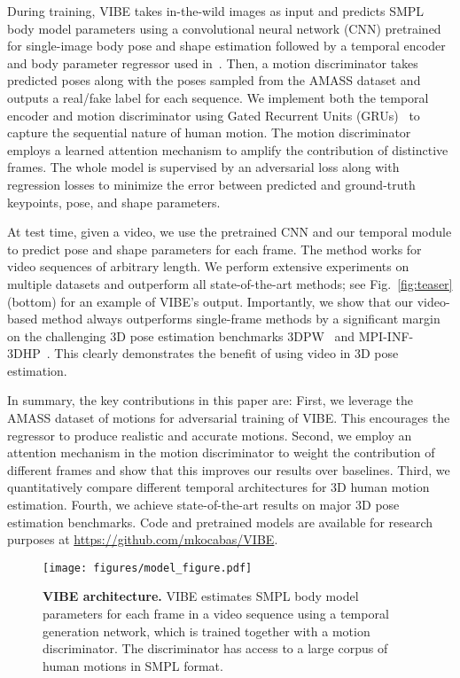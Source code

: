 \documentclass[10pt,twocolumn,letterpaper]{article}
\begin{document}
During training, VIBE takes in-the-wild images as input and predicts SMPL body model parameters using a convolutional neural network (CNN) pretrained for single-image body pose and shape estimation \cite{SPIN:ICCV:2019} followed by a temporal encoder and body parameter regressor used in~\cite{kanazawa_hmr}. 
Then, a motion discriminator takes predicted poses along with the poses sampled from the AMASS dataset and outputs a real/fake label for each sequence. 
We implement both the temporal encoder and motion discriminator using Gated Recurrent Units (GRUs)~\cite{gru} to capture the sequential nature of human motion. 
The motion discriminator employs a learned attention mechanism to amplify the contribution of distinctive frames.
The whole model is supervised by an adversarial loss along with regression losses to minimize the error between predicted and ground-truth keypoints, pose, and shape parameters. 


At test time, given a video, we use the pretrained CNN \cite{SPIN:ICCV:2019} and our temporal module to predict pose and shape parameters for each frame.   
The method works for video sequences of arbitrary length.
We perform extensive experiments on multiple datasets and outperform all state-of-the-art methods;
see Fig.~\ref{fig:teaser} (bottom) for an example of VIBE's output.
Importantly, we show that our video-based method always outperforms single-frame methods by a significant margin on the challenging 3D pose estimation benchmarks 3DPW~\cite{vonMarcard2018_3dpw} and MPI-INF-3DHP~\cite{mpiiinf3dhp_mono-2017}.
This clearly demonstrates the benefit of using video in 3D pose estimation.




In summary, the key contributions in this paper are:
First, we leverage the AMASS dataset of motions for adversarial training of VIBE.  This encourages the regressor to produce realistic and accurate motions.  Second, we employ an attention mechanism in the motion discriminator to weight the contribution of different frames  and show that this improves our results over baselines.
Third, we quantitatively compare different temporal architectures for 3D human motion estimation.
Fourth, we achieve state-of-the-art results on major 3D pose estimation benchmarks. Code and pretrained models are available for research purposes at \url{https://github.com/mkocabas/VIBE}.
 \begin{figure*}
	\centering
	\texttt{[image: figures/model\_figure.pdf]}
	\caption{\textbf{VIBE architecture.} VIBE estimates SMPL body
		model parameters for each frame in a video sequence using a
		temporal generation network, which is trained together with a
		motion discriminator. The discriminator has access to a large
		corpus of human motions in SMPL format.}
	\label{fig:model}
\end{figure*}{}
\end{document}
